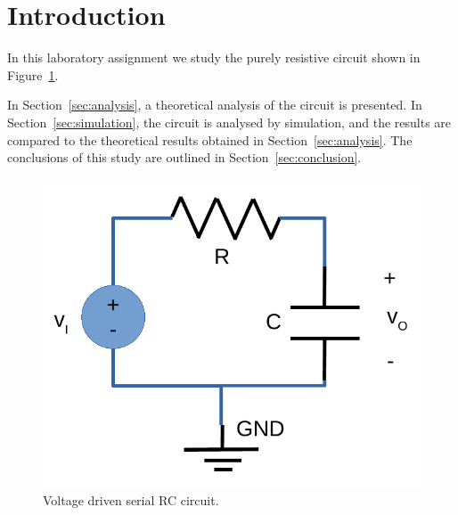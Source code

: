 \section{Introduction}
\label{sec:introduction}

In this laboratory assignment we study the purely resistive circuit shown in Figure~\ref{fig:rc}.



In Section~\ref{sec:analysis}, a theoretical analysis of the circuit is
presented. In Section~\ref{sec:simulation}, the circuit is analysed by
simulation, and the results are compared to the theoretical results obtained in
Section~\ref{sec:analysis}. The conclusions of this study are outlined in
Section~\ref{sec:conclusion}.

\begin{figure}[ht] \centering
    \includegraphics[width=0.4\linewidth]{rc.pdf}
    \caption{Voltage driven serial RC circuit.}
    \label{fig:rc}
\end{figure}

